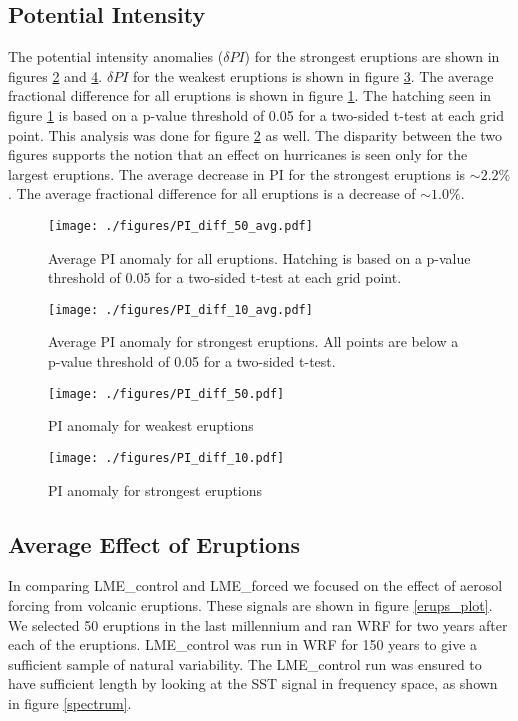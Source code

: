 \subsection{Potential Intensity}
The potential intensity anomalies ($\delta PI$) for the strongest eruptions are shown in figures \ref{pi_10_avg} and \ref{pi_10_str}. $\delta PI$ for the weakest eruptions is shown in figure \ref{pi_10_wk}. The average fractional difference for all eruptions is shown in figure \ref{pi_all_avg}. The hatching seen in figure \ref{pi_all_avg} is based on a p-value threshold of 0.05 for a two-sided t-test at each grid point. This analysis was done for figure \ref{pi_10_avg} as well. The disparity between the two figures supports the notion that an effect on hurricanes is seen only for the largest eruptions. The average decrease in PI for the strongest eruptions is $\sim2.2\%$. The average fractional difference for all eruptions is a decrease of $\sim1.0\%$.   

\begin{figure}[!tbp]
\centering
\texttt{[image: ./figures/PI\_diff\_50\_avg.pdf]}
\caption{Average PI anomaly for all eruptions. Hatching is based on a p-value threshold of 0.05 for a two-sided t-test at each grid point.}
\label{pi_all_avg}
\end{figure}

\begin{figure}[!tbp]
\centering
\texttt{[image: ./figures/PI\_diff\_10\_avg.pdf]}
\caption{Average PI anomaly for strongest eruptions. All points are below a p-value threshold of 0.05 for a two-sided t-test.}
\label{pi_10_avg}
\end{figure}

\begin{figure}[!tbp]
\centering
\texttt{[image: ./figures/PI\_diff\_50.pdf]}
\caption{PI anomaly for weakest eruptions}
\label{pi_10_wk}
\end{figure}

\begin{figure}[!tbp]
\centering
\texttt{[image: ./figures/PI\_diff\_10.pdf]}
\caption{PI anomaly for strongest eruptions}
\label{pi_10_str}
\end{figure}



\subsection{Average Effect of Eruptions}
In comparing LME_{control} and LME_{forced} we focused on the effect of aerosol forcing from volcanic eruptions. These signals are shown in figure \ref{erups_plot}. We selected 50 eruptions in the last millennium and ran WRF for two years after each of the eruptions. LME_{control} was run in WRF for 150 years to give a sufficient sample of natural variability. The LME_{control} run was ensured to have sufficient length by looking at the SST signal in frequency space, as shown in figure \ref{spectrum}.

